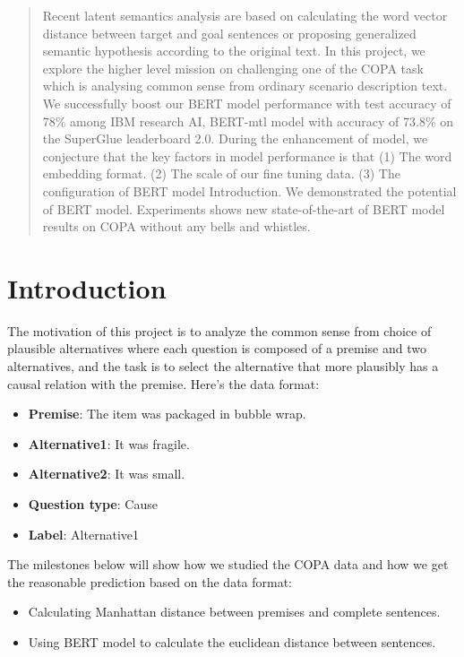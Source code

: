 \documentclass{article}
\begin{document}
\printAffiliationsAndNotice{\icmlEqualContribution} %

\begin{abstract}
Recent latent semantics analysis are based on calculating the word vector distance between target and goal sentences or proposing generalized semantic hypothesis according to the original text. In this project, we explore the higher level mission on challenging one of the COPA task which is analysing common sense from ordinary scenario description text. We successfully boost our BERT model performance with test accuracy of 78\% among IBM research AI, BERT-mtl model with accuracy of 73.8\% on the SuperGlue leaderboard 2.0. During the enhancement of model, we conjecture that the key factors in model performance is that (1) The word embedding format. (2) The scale of our fine tuning data. (3) The configuration of BERT model Introduction. We demonstrated the potential of BERT model. Experiments shows new state-of-the-art of BERT model results on COPA without any bells and whistles.  
\end{abstract}



\section{Introduction}

\label{submission}
The motivation of this project is to analyze the common sense from choice of plausible alternatives where each question is composed of a premise and two alternatives, and the task is to select the alternative that more plausibly has a causal relation with the premise. Here’s the data format:
\begin{center}
\begin{itemize}
    \item \textbf{Premise}: The item was packaged in bubble wrap.
    \item \textbf{Alternative1}: It was fragile.
    \item \textbf{Alternative2}: It was small.
    \item \textbf{Question type}: Cause
    \item \textbf{Label}: Alternative1
\end{itemize}
\end{center}
The milestones below will show how we studied the COPA data and how we get the reasonable prediction based on the data format:
\begin{itemize}
\item Calculating Manhattan distance between premises and complete sentences.  
\item Using BERT model to calculate the euclidean distance between sentences.
\end{itemize}
\end{document}
